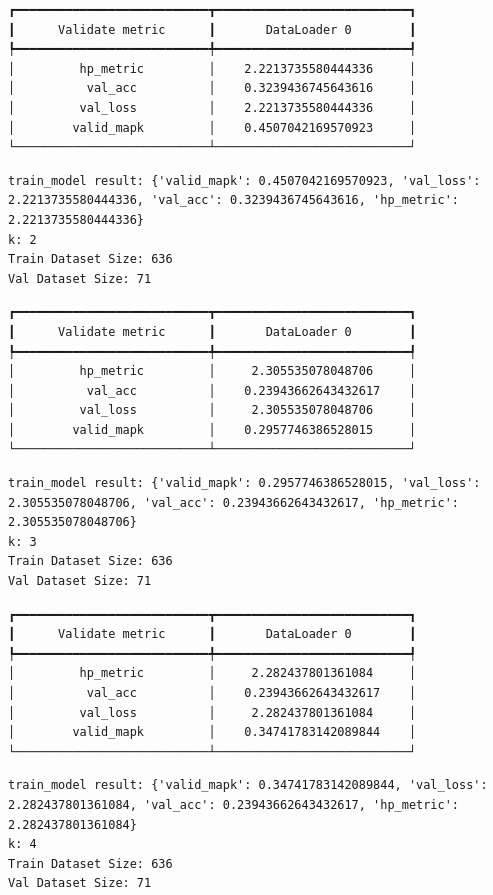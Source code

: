\documentclass[
  letterpaper,
  DIV=11,
  numbers=noendperiod]{scrreprt}
\begin{document}
\begin{verbatim}
┏━━━━━━━━━━━━━━━━━━━━━━━━━━━┳━━━━━━━━━━━━━━━━━━━━━━━━━━━┓
┃      Validate metric      ┃       DataLoader 0        ┃
┡━━━━━━━━━━━━━━━━━━━━━━━━━━━╇━━━━━━━━━━━━━━━━━━━━━━━━━━━┩
│         hp_metric         │    2.2213735580444336     │
│          val_acc          │    0.3239436745643616     │
│         val_loss          │    2.2213735580444336     │
│        valid_mapk         │    0.4507042169570923     │
└───────────────────────────┴───────────────────────────┘
\end{verbatim}

\begin{verbatim}
train_model result: {'valid_mapk': 0.4507042169570923, 'val_loss': 2.2213735580444336, 'val_acc': 0.3239436745643616, 'hp_metric': 2.2213735580444336}
k: 2
Train Dataset Size: 636
Val Dataset Size: 71
\end{verbatim}

\begin{verbatim}
┏━━━━━━━━━━━━━━━━━━━━━━━━━━━┳━━━━━━━━━━━━━━━━━━━━━━━━━━━┓
┃      Validate metric      ┃       DataLoader 0        ┃
┡━━━━━━━━━━━━━━━━━━━━━━━━━━━╇━━━━━━━━━━━━━━━━━━━━━━━━━━━┩
│         hp_metric         │     2.305535078048706     │
│          val_acc          │    0.23943662643432617    │
│         val_loss          │     2.305535078048706     │
│        valid_mapk         │    0.2957746386528015     │
└───────────────────────────┴───────────────────────────┘
\end{verbatim}

\begin{verbatim}
train_model result: {'valid_mapk': 0.2957746386528015, 'val_loss': 2.305535078048706, 'val_acc': 0.23943662643432617, 'hp_metric': 2.305535078048706}
k: 3
Train Dataset Size: 636
Val Dataset Size: 71
\end{verbatim}

\begin{verbatim}
┏━━━━━━━━━━━━━━━━━━━━━━━━━━━┳━━━━━━━━━━━━━━━━━━━━━━━━━━━┓
┃      Validate metric      ┃       DataLoader 0        ┃
┡━━━━━━━━━━━━━━━━━━━━━━━━━━━╇━━━━━━━━━━━━━━━━━━━━━━━━━━━┩
│         hp_metric         │     2.282437801361084     │
│          val_acc          │    0.23943662643432617    │
│         val_loss          │     2.282437801361084     │
│        valid_mapk         │    0.34741783142089844    │
└───────────────────────────┴───────────────────────────┘
\end{verbatim}

\begin{verbatim}
train_model result: {'valid_mapk': 0.34741783142089844, 'val_loss': 2.282437801361084, 'val_acc': 0.23943662643432617, 'hp_metric': 2.282437801361084}
k: 4
Train Dataset Size: 636
Val Dataset Size: 71
\end{verbatim}
\end{document}

